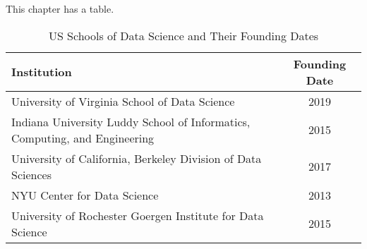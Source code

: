This chapter has a table.


\begin{table}[ht]
    \centering
    \begin{tabular}{p{8cm}c}
        \toprule
    \textbf{Institution} & \textbf{Founding Date} \\ \midrule
    University of Virginia School of Data Science & 2019 \\ 
    Indiana University Luddy School of Informatics, Computing, and Engineering & 2015 \\ 
    University of California, Berkeley Division of Data Sciences & 2017 \\ 
    NYU Center for Data Science & 2013 \\ 
    University of Rochester Goergen Institute for Data Science & 2015 \\ \bottomrule
    \end{tabular}
    \caption{US Schools of Data Science and Their Founding Dates}
    \end{table}
    